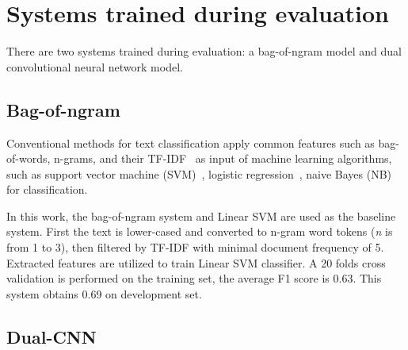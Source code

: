 \documentclass[11pt]{article}
\begin{document}
\section{Systems trained during evaluation}

There are two systems trained during evaluation: a bag-of-ngram model and dual convolutional neural network model.

\subsection{Bag-of-ngram}

Conventional methods for text classification apply common features such as bag-of-words, n-grams, and their TF-IDF~\cite{4811259} as input of machine learning algorithms, such as support vector machine (SVM)~\cite{10.1007/BFb0026683}, logistic regression~\cite{004017007000000245}, naive Bayes (NB)~\cite{Mccallum1998A} for classification.

In this work, the bag-of-ngram system and Linear SVM are used as the baseline system. First the text is lower-cased and converted to n-gram word tokens (\textit{n} is from 1 to 3), then filtered by TF-IDF with minimal document frequency of 5. Extracted features are utilized to train Linear SVM classifier. A 20 folds cross validation is performed on the training set, the average F1 score is 0.63. This system obtains 0.69 on development set. 



\subsection{Dual-CNN}
\label{sect:pdf}
\end{document}
